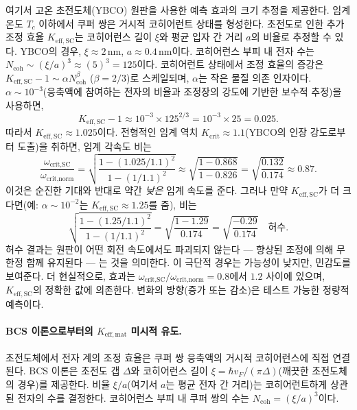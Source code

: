 \documentclass[12pt,a4paper]{article}
\newcommand{\betaf}{\beta}
\begin{document}
	여기서 고온 초전도체(YBCO) 원판을 사용한 예측 효과의 크기 추정을 제공한다. 임계 온도 \(T_c\) 이하에서 쿠퍼 쌍은 거시적 코히어런트 상태를 형성한다. 초전도로 인한 추가 조정 효율 \(K_{\mathrm{eff,SC}}\)는 코히어런스 길이 \(\xi\)와 평균 입자 간 거리 \(a\)의 비율로 추정할 수 있다. YBCO의 경우, \(\xi \approx 2\,\text{nm}\), \(a \approx 0.4\,\text{nm}\)이다. 코히어런스 부피 내 전자 수는 \(N_{\text{coh}} \sim (\xi/a)^3 \approx (5)^3 = 125\)이다. 코히어런트 상태에서 조정 효율의 증강은 \(K_{\mathrm{eff,SC}} - 1 \sim \alpha N_{\text{coh}}^{\betaf}\) (\(\betaf = 2/3\))로 스케일되며, \(\alpha\)는 작은 물질 의존 인자이다. \(\alpha \sim 10^{-3}\)(응축액에 참여하는 전자의 비율과 조정장의 강도에 기반한 보수적 추정)을 사용하면,
	\[
	K_{\mathrm{eff,SC}} - 1 \approx 10^{-3} \times 125^{2/3} = 10^{-3} \times 25 = 0.025.
	\]
	따라서 \(K_{\mathrm{eff,SC}} \approx 1.025\)이다. 전형적인 임계 역치 \(K_{\mathrm{crit}} \approx 1.1\)(YBCO의 인장 강도로부터 도출)을 취하면, 임계 각속도 비는
	\[
	\frac{\omega_{\text{crit,SC}}}{\omega_{\text{crit,norm}}} = \sqrt{ \frac{1 - (1.025/1.1)^2}{1 - (1/1.1)^2} } \approx \sqrt{ \frac{1 - 0.868}{1 - 0.826} } = \sqrt{ \frac{0.132}{0.174} } \approx 0.87.
	\]
	이것은 순진한 기대와 반대로 약간 \textit{낮은} 임계 속도를 준다. 그러나 만약 \(K_{\mathrm{eff,SC}}\)가 더 크다면(예: \(\alpha \sim 10^{-2}\)는 \(K_{\mathrm{eff,SC}} \approx 1.25\)를 줌), 비는
	\[
	\sqrt{ \frac{1 - (1.25/1.1)^2}{1 - (1/1.1)^2} } = \sqrt{ \frac{1 - 1.29}{0.174} } = \sqrt{ \frac{-0.29}{0.174} } \quad \text{허수}.
	\]
	허수 결과는 원판이 어떤 회전 속도에서도 파괴되지 않는다 — 향상된 조정에 의해 무한정 함께 유지된다 — 는 것을 의미한다. 이 극단적 경우는 가능성이 낮지만, 민감도를 보여준다. 더 현실적으로, 효과는 \(\omega_{\text{crit,SC}}/\omega_{\text{crit,norm}} = 0.8\)에서 \(1.2\) 사이에 있으며, \(K_{\mathrm{eff,SC}}\)의 정확한 값에 의존한다. 변화의 방향(증가 또는 감소)은 테스트 가능한 정량적 예측이다.
	
	\paragraph{BCS 이론으로부터의 \(K_{\mathrm{eff,mat}}\) 미시적 유도.}
	초전도체에서 전자 계의 조정 효율은 쿠퍼 쌍 응축액의 거시적 코히어런스에 직접 연결된다. BCS 이론은 초전도 갭 \(\Delta\)와 코히어런스 길이 \(\xi = \hbar v_F / (\pi \Delta)\)(깨끗한 초전도체의 경우)를 제공한다. 비율 \(\xi / a\)(여기서 \(a\)는 평균 전자 간 거리)는 코히어런트하게 상관된 전자의 수를 결정한다. 코히어런스 부피 내 쿠퍼 쌍의 수는 \(N_{\text{coh}} = (\xi/a)^3\)이다.
	
\end{document}

